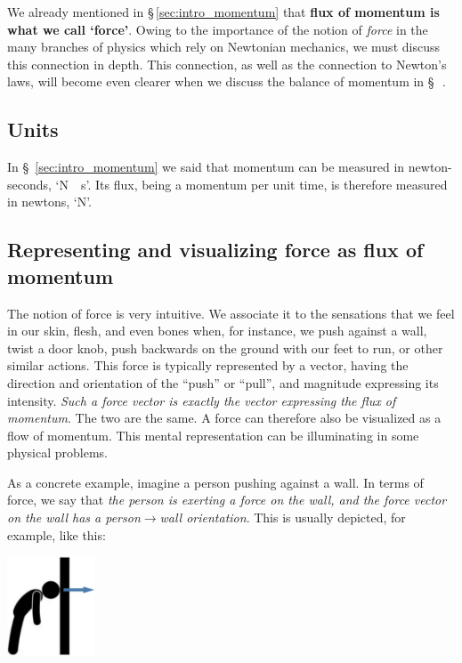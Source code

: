 \documentclass[a4paper,12pt,%
onecolumn,oneside,titlepage,%
british%
]{memoir}
\newcommand{\mynotew}[1]{{\footnotesize\color{midgrey}\faIcon{tools}\ #1}}
\renewcommand*{\|}[1][]{\nonscript\:#1\vert\nonscript\:\mathopen{}}
\newcommand*{\sect}{\S}%
\begin{document}
We already mentioned in \sect\,\ref{sec:intro_momentum} that \textbf{flux of momentum is what we call \enquote*{force}}. Owing to the importance of the notion of \emph{force} in the many branches of physics which rely on Newtonian mechanics, we must discuss this connection in depth. This connection, as well as the connection to Newton's laws, will become even clearer when we discuss the balance of momentum in \sect\,\mynotew{}.

\subsection{Units}
\label{sec:units_momflux}

In \sect~\ref{sec:intro_momentum} we said that momentum can be measured in newton-seconds, \enquote*{\unit{N\cdot s}}. Its flux, being a momentum per unit time, is therefore measured in newtons, \enquote*{\unit{N}}.

\subsection{Representing and visualizing force as flux of momentum}
\label{sec:visualize_force}

The notion of force is very intuitive. We associate it to the sensations that we feel in our skin, flesh, and even bones when, for instance, we push against a wall, twist a door knob, push backwards on the ground with our feet to run, or other similar actions. This force is typically represented by a vector, having the direction and orientation of the \enquote{push} or \enquote{pull}, and magnitude expressing its intensity. \emph{Such a force vector is exactly the vector expressing the flux of momentum}. The two are the same. A force can therefore also be visualized as a flow of momentum. This mental representation can be illuminating in some physical problems.

As a concrete example, imagine a person pushing against a wall. In terms of force, we say that \emph{the person is exerting a force on the wall,
  and the force vector on the wall has a person$\rightarrow$wall orientation}. This is usually depicted, for example, like this:%
\begin{center}
    \includegraphics[height=8em]{person_push_force.pdf}
\end{center}
\end{document}
